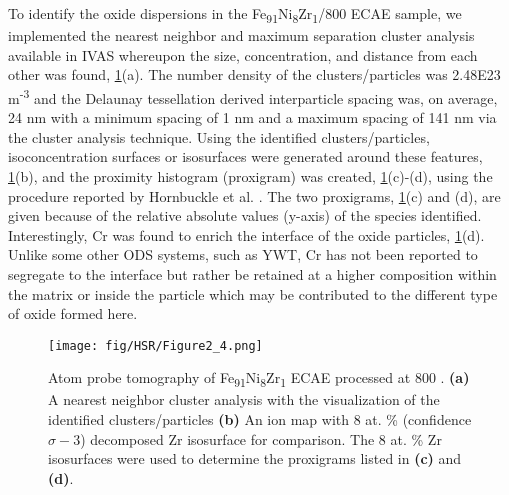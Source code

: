 		To identify the oxide dispersions in the Fe\textsubscript{91}Ni\textsubscript{8}Zr\textsubscript{1}/800 \celsius{}   ECAE sample, we implemented the nearest neighbor and maximum separation cluster analysis \cite{RN382,RN807,RN2674} available in IVAS whereupon the size, concentration, and distance from each other was found, \ref{fig:HSR2}(a). The number density of the clusters/particles was 2.48E23 m\textsuperscript{-3} and the Delaunay tessellation derived interparticle spacing \cite{RN2626} was, on average, 24 nm with a minimum spacing of 1 nm and a maximum spacing of 141 nm via the cluster analysis technique. Using the identified clusters/particles, isoconcentration surfaces or isosurfaces were generated around these features, \ref{fig:HSR2}(b), and the proximity histogram (proxigram) was created, \ref{fig:HSR2}(c)-(d), using the procedure reported by Hornbuckle et al. \cite{RN214}. The two proxigrams, \ref{fig:HSR2}(c) and (d), are given because of the relative absolute values (y-axis) of the species identified. Interestingly, Cr was found to enrich the interface of the oxide particles, \ref{fig:HSR2}(d). Unlike some other ODS systems, such as YWT, Cr has not been reported to segregate to the interface but rather be retained at a higher composition within the matrix or inside the particle \cite{RN737} which may be contributed to the different type of oxide formed here. 
		
		\begin{figure}
			\centering
			\texttt{[image: fig/HSR/Figure2\_4.png]}
			\caption[Atom probe tomography of Fe\textsubscript{91}Ni\textsubscript{8}Zr\textsubscript{1} ECAE processed at 800 \celsius{}.]{Atom probe tomography of Fe\textsubscript{91}Ni\textsubscript{8}Zr\textsubscript{1} ECAE processed at 800 \celsius{}. \textbf{(a)} A nearest neighbor cluster analysis with the visualization of the identified clusters/particles \textbf{(b)} An ion map with
				8 at. \% (confidence $\sigma-3${}) decomposed Zr isosurface for comparison. The 8 at. \% Zr isosurfaces were used to determine the proxigrams listed in \textbf{(c)} and \textbf{(d)}.}
			\label{fig:HSR2}
		\end{figure}
		
